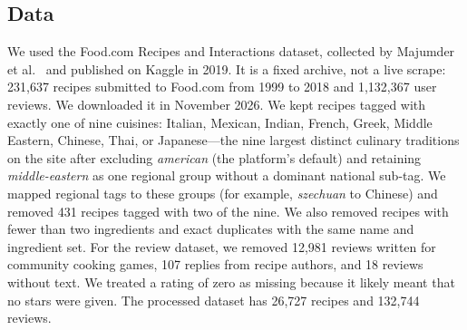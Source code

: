 
\subsection*{Data}
We used the Food.com Recipes and Interactions dataset, collected by Majumder et al.\ \cite{majumder2019generating} and published on Kaggle in 2019. It is a fixed archive, not a live scrape: 231,637 recipes submitted to Food.com from 1999 to 2018 and 1,132,367 user reviews. We downloaded it in November 2026. We kept recipes tagged with exactly one of nine cuisines: Italian, Mexican, Indian, French, Greek, Middle Eastern, Chinese, Thai, or Japanese---the nine largest distinct culinary traditions on the site after excluding \emph{american} (the platform's default) and retaining \emph{middle-eastern} as one regional group without a dominant national sub-tag. We mapped regional tags to these groups (for example, \emph{szechuan} to Chinese) and removed 431 recipes tagged with two of the nine. We also removed recipes with fewer than two ingredients and exact duplicates with the same name and ingredient set. For the review dataset, we removed 12,981 reviews written for community cooking games, 107 replies from recipe authors, and 18 reviews without text. We treated a rating of zero as missing because it likely meant that no stars were given. The processed dataset has 26,727 recipes and 132,744 reviews.




